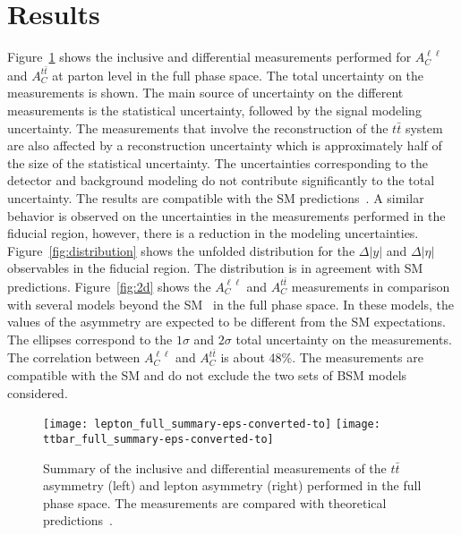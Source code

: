 \documentclass[12pt]{article}
\begin{document}
\section{Results}
Figure~\ref{fig:sumary} shows the inclusive and differential measurements performed for $A_C^{\ell \ell}$ and  $A_C^{t\bar{t}}$ at parton level in the full phase space. The total uncertainty on the measurements is shown. The main source of uncertainty on the different measurements is the statistical uncertainty, followed by the signal modeling uncertainty. The measurements that involve the reconstruction of the $t\bar{t}$ system are also affected by a reconstruction uncertainty which is approximately half of the size of the statistical uncertainty. The uncertainties corresponding to the detector and background modeling do not contribute significantly to the total uncertainty. The results are compatible with the SM predictions~\cite{Bernreuther:2012sx}. A similar behavior is observed on the uncertainties in the measurements performed in the fiducial region, however, there is a reduction in the modeling uncertainties. Figure~\ref{fig:distribution} shows the unfolded distribution for the $\Delta|y|$ and $\Delta|\eta|$ observables in the fiducial region. The distribution is in agreement with SM predictions. Figure~\ref{fig:2d} shows the $A_C^{\ell \ell}$ and $A_C^{t\bar{t}}$ measurements in comparison with several models beyond the SM~\cite{Aguilar-Saavedra:2014nja} in the full phase space. In these models, the values of the asymmetry are expected to be different from the SM expectations. The ellipses correspond to the $1\sigma$ and $2\sigma$ total uncertainty on the measurements. The correlation between $A_C^{\ell \ell}$ and $A_C^{t\bar{t}}$ is about 48\%. The measurements are compatible with the SM and do not exclude the two sets of BSM models considered.
\begin{figure}[htb]
\centering
\texttt{[image: lepton\_full\_summary-eps-converted-to]}
\texttt{[image: ttbar\_full\_summary-eps-converted-to]}

\caption{Summary of the inclusive and differential measurements of the $t\bar{t}$ asymmetry (left) and lepton asymmetry (right) performed in the full phase space. The measurements are compared with theoretical predictions~\cite{Aad:2016ove}.}
\label{fig:sumary}
\end{figure}
\end{document}
